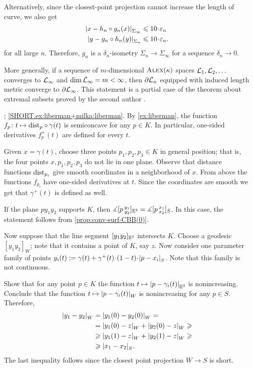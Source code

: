 Alternatively, since the closest-point projection cannot increase the length of curve, we also get
\begin{align*}
\dist{x}{h_n\circ g_n(x)}{\Sigma_\infty}&\le 10\cdot \eps_n
\\
\dist{y}{g_n\circ h_n(y)}{\Sigma_n}&\le 10\cdot \eps_n.
\end{align*}
for all large $n$.
Therefore, $g_n$ is a $\delta_n$-isometry $\Sigma_n\to\Sigma_\infty$ for a sequence $\delta_n\to 0$.

More generally, if a sequence of $m$-dimensional $\textsc{Alex}(\kappa)$ spaces $\mathcal{L}_1,\mathcal{L}_2,\dots$ converges to $\mathcal{L}_\infty$ and $\operatorname{\rm dim}\nolimits \mathcal{L}_\infty=m<\infty$,
then $\partial \mathcal{L}_n$ equipped with induced length metric converge to  $\partial \mathcal{L}_\infty$.
This statement is a partial case of the theorem about extremal subsets proved by the second author \cite[1.2]{petrunin1997}.

\parbf{\ref{ex:liberman+milka}}; \ref{SHORT.ex:liberman+milka:liberman}.
By \ref{ex:liberman}, the function $f_p\colon t\mapsto \mathrm{dist}_p\circ\gamma(t)$ is semiconcave for any $p\in K$.
In particular, one-sided derivatives $f_p^+(t)$ are defined for every $t$.

Given $x=\gamma(t)$, choose three points $p_1,p_2,p_3\in K$ in general position;
that is, the four points $x,p_1,p_2,p_3$ do not lie in one plane.
Observe that distance functions $\mathrm{dist}_{p_i}$ give smooth coordinates in a neighborhood of $x$.
From above the functions $f_{p_i}$ have one-sided derivatives at $t$.
Since the coordinates are smooth we get that $\gamma^+(t)$ is defined as well.

If the plane $py_1y_2$ supports $K$, then 
$\measuredangle[p\,{}^{y_1}_{y_2}]_{\mathbb{E}^3}=\measuredangle[p\,{}^{x_1}_{x_2}]_S$.
In this case, the statement follows from \ref{prop:conv-surf-CBB(0)}.

Now suppose that the line segment $[y_1y_2]_{\mathbb{E}^3}$ intersects $K$.
Choose a geodesic $[y_1y_2]_W$;
note that it contains a point of $K$, say $z$.
Now consider one parameter family of points 
$y_i(t)\df \gamma(t)+\gamma^+(t)\cdot (1-t)\cdot \dist{p}{x_i}{S}$.
Note that this family is not continuous.

Show that for any point $p\in K$ the function $t\mapsto \dist{p}{\gamma_i(t)}{\EE^3}$ is nonincreasing.
Conclude that the function $t\mapsto \dist{p}{\gamma_i(t)}{W}$ is nonincreasing for any $p\in S$.
Therefore, 
\begin{align*}
\dist{y_1}{y_2}{W}
&=\dist{y_1(0)}{y_2(0)}{W}=
\\
&=\dist{y_1(0)}{z}{W}+\dist{y_2(0)}{z}{W}\ge
\\
&\ge\dist{y_1(1)}{z}{W}+\dist{y_2(1)}{z}{W}\ge 
\\
&\ge\dist{x_1}{x_2}{S}.
\end{align*}
The last inequality follows since the closest point projection $W\to S$ is short.

